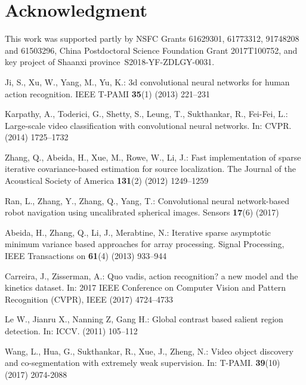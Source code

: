 \documentclass[runningheads,a4paper]{llncs}
\begin{document}
\section*{Acknowledgment}
This work was supported partly by NSFC Grants 61629301, 61773312, 91748208 and 61503296, China Postdoctoral Science Foundation Grant 2017T100752, and key project of Shaanxi province S2018-YF-ZDLGY-0031.

%
%
\begin{thebibliography}{10}
	Ji, S., Xu, W., Yang, M., Yu, K.:
	\newblock 3d convolutional neural networks for human action recognition.
	\newblock IEEE T-PAMI \textbf{35}(1) (2013)  221--231

	Karpathy, A., Toderici, G., Shetty, S., Leung, T., Sukthankar, R., Fei-Fei, L.:
	\newblock Large-scale video classification with convolutional neural networks.
	\newblock In: CVPR. (2014)  1725--1732

	Zhang, Q., Abeida, H., Xue, M., Rowe, W., Li, J.:
	\newblock Fast implementation of sparse iterative covariance-based estimation
	for source localization.
	\newblock The Journal of the Acoustical Society of America \textbf{131}(2)
	(2012)  1249--1259

	Ran, L., Zhang, Y., Zhang, Q., Yang, T.:
	\newblock Convolutional neural network-based robot navigation using
	uncalibrated spherical images.
	\newblock Sensors \textbf{17}(6) (2017)

	Abeida, H., Zhang, Q., Li, J., Merabtine, N.:
	\newblock Iterative sparse asymptotic minimum variance based approaches for
	array processing.
	\newblock Signal Processing, IEEE Transactions on \textbf{61}(4) (2013)
	933--944

	Carreira, J., Zisserman, A.:
	\newblock Quo vadis, action recognition? a new model and the kinetics dataset.
	\newblock In: 2017 IEEE Conference on Computer Vision and Pattern Recognition
	(CVPR), IEEE (2017)  4724--4733

	Le W., Jianru X., Nanning Z, Gang H.:
	\newblock Global contrast based salient region detection.
	\newblock In: ICCV. (2011)  105--112

	Wang, L., Hua, G., Sukthankar, R., Xue, J., Zheng, N.:
	\newblock Video object discovery and co-segmentation with extremely weak supervision.
	\newblock In: T-PAMI. \textbf{39}(10) (2017)  2074-2088


\end{thebibliography}
\end{document}
